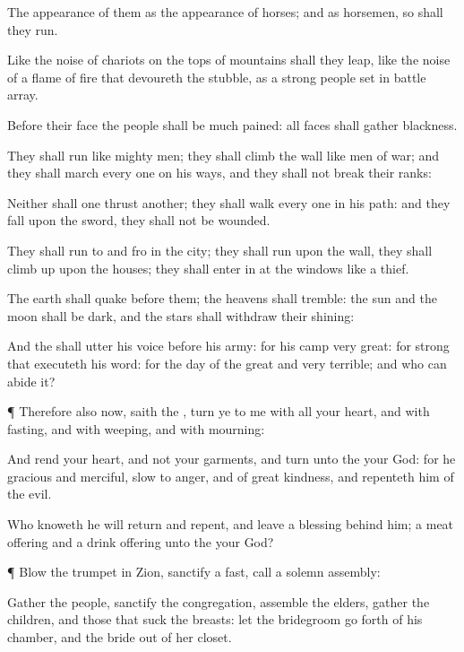 {The
appearance of them
{} as the
appearance of
horses; and as
horsemen, so shall they
run.

Like the
noise of
chariots on the
tops of
mountains shall they
leap, like the
noise of a
flame of
fire that
devoureth the
stubble, as a
strong
people set in
battle
array.

Before their
face the
people shall be much
pained: all
faces shall
gather
blackness.

They shall
run like mighty
men; they shall
climb the
wall like
men of
war; and they shall
march every
one on his
ways, and they shall not
break their
ranks:

Neither shall
one
thrust
another; they shall
walk every
one in his
path: and
{} they
fall upon the
sword, they shall not be
wounded.

They shall run to and
fro in the
city; they shall
run upon the
wall, they shall climb
up upon the
houses; they shall enter
in at the
windows like a
thief.

The
earth shall
quake
before them; the
heavens shall
tremble: the
sun and the
moon shall be
dark, and the
stars shall
withdraw their
shining:

And the
{} shall
utter his
voice
before his
army: for his
camp
{}
very
great: for
{}
strong that
executeth his
word: for the
day of the
{}
{}
great and
very
terrible; and who can
abide it?


\par }{\PP {}¶ Therefore also now,
saith the
{},
turn ye
{} to me with all your
heart, and with
fasting, and with
weeping, and with
mourning:

And
rend your
heart, and not your
garments, and
turn unto the
{} your
God: for he
{}
gracious and
merciful,
slow to
anger, and of
great
kindness, and
repenteth him of the
evil.

Who
knoweth
{} he will
return and
repent, and
leave a
blessing
behind him;
{} a meat
offering and a drink
offering unto the
{} your
God?


\par }{\PP {}¶
Blow the
trumpet in
Zion,
sanctify a
fast,
call a solemn
assembly:

Gather the
people,
sanctify the
congregation,
assemble the
elders,
gather the
children, and those that
suck the
breasts: let the
bridegroom go
forth of his
chamber, and the
bride out of her
closet.

}
